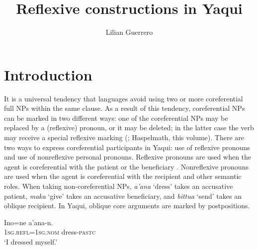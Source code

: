\documentclass[output=paper]{langscibook}
\author{Lilian Guerrero\affiliation{Universidad Nacional Autónoma de México}}
\title{Reflexive constructions in Yaqui}
\begin{document}
\maketitle
\section{Introduction}\label{sec:guerrero:1}


It is a universal tendency that languages avoid using two or more coreferential full NPs within the same clause. As a result of this tendency, coreferential NPs can be marked in two different ways: one of the coreferential NPs may be replaced by a (reflexive) pronoun, or it may be deleted; in the latter case the verb may receive a special reflexive marking (\citealt{Kemmer1993, Kazenin2001, KoenigGast2008}; Haspelmath, this volume). There are two ways to express coreferential participants in Yaqui: use of reflexive pronouns and use of nonreflexive personal pronouns. Reflexive pronouns are used when the agent is coreferential with the patient  or the beneficiary . Nonreflexive pronouns are used when the agent is coreferential with the recipient  and other semantic roles. When taking non-coreferential NPs, \textit{a’ana} ‘dress’ takes an accusative patient, \textit{maka} ‘give’ takes an accusative beneficiary, and \textit{bittua} ‘send’ takes an oblique recipient. In Yaqui, oblique core arguments are marked by postpositions.



\ea%
    \label{ex:guerrero:1}
\ea
\label{ex:guerrero:1a}
\gll Ino=ne     a’ana-n.\\
\textsc{1sg.refl}=\textsc{1sg.nom}   dress\textsc{{}-pastc}\\
\glt ‘I dressed myself.’
\end{document}
